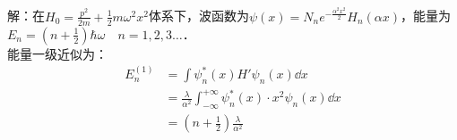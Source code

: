 \subsection{ }
解：在$H_0=\frac{p^2}{2m}+\frac{1}{2}m\omega^2x^2$体系下，波函数为$\psi(x)=N_ne^{-\frac{\alpha^2x^2}{2}}H_n(\alpha x) $，能量为$E_n=(n+\frac{1}{2})\hbar\omega \quad n=1,2,3\dots$．\\
能量一级近似为：
\begin{equation}
\begin{aligned}
E^{(1)}_n&=\int \psi^*_n(x)H'\psi_n(x)\dd{x} \\
&=\frac{\lambda}{\alpha^2}\int^{+\infty}_{-\infty}\psi^*_n(x)\cdot x^2\psi_n(x)\dd{x} \\
&=(n+\frac{1}{2})\frac{\lambda}{\alpha^2}
\end{aligned}
\end{equation}